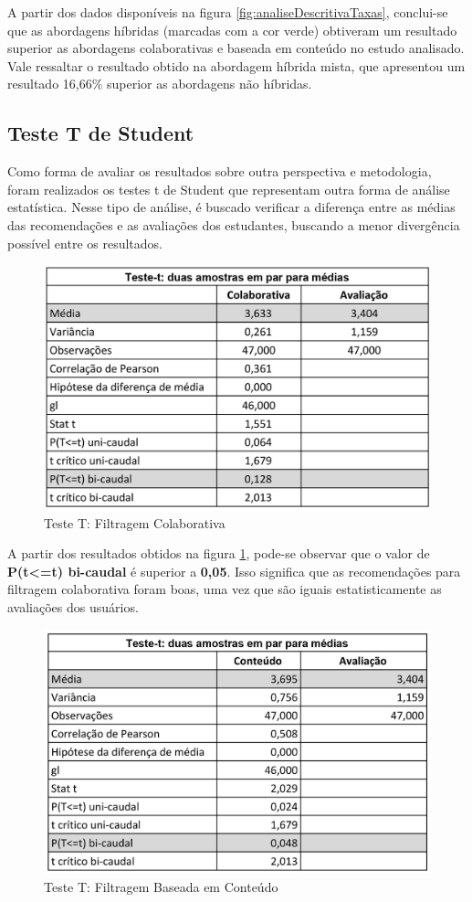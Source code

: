 A partir dos dados disponíveis na figura \ref{fig:analiseDescritivaTaxas}, conclui-se que as abordagens híbridas (marcadas com a cor verde) obtiveram um resultado superior as abordagens colaborativas e baseada em conteúdo no estudo analisado. Vale ressaltar o resultado obtido na abordagem híbrida mista, que apresentou um resultado 16,66\% superior as abordagens não híbridas.

\subsection{Teste T de Student}

Como forma de avaliar os resultados sobre outra perspectiva e metodologia, foram realizados os testes t de Student que representam outra forma de análise estatística. Nesse tipo de análise, é buscado verificar a diferença entre as médias das recomendações e as avaliações dos estudantes, buscando a menor divergência possível entre os resultados.

\begin{figure}[H]
	\centering
	\includegraphics[width=.7\linewidth]{imagens/testeTColaborativa.jpg}
	\caption[Teste T: Filtragem Colaborativa]{Teste T: Filtragem Colaborativa}
    \label{fig:testeTColaborativa}
\end{figure}

A partir dos resultados obtidos na figura \ref{fig:testeTColaborativa}, pode-se observar que o valor de \textbf{P(t<=t) bi-caudal} é superior a \textbf{0,05}. Isso significa que as recomendações para filtragem colaborativa foram boas, uma vez que são iguais estatisticamente as avaliações dos usuários.

\begin{figure}[H]
	\centering
	\includegraphics[width=.7\linewidth]{imagens/testeTConteudo.jpg}
	\caption[Teste T: Filtragem Baseada em Conteúdo]{Teste T: Filtragem Baseada em Conteúdo}
    \label{fig:testeTConteudo}
\end{figure}

